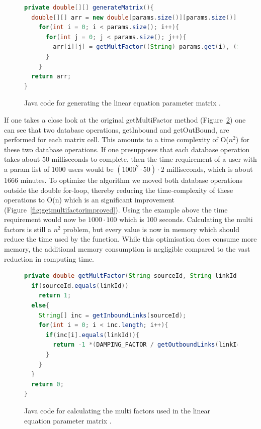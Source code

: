 \begin{figure}[h!]
\begin{lstlisting}[language=java]
private double[][] generateMatrix(){ 
  double[][] arr = new double[params.size()][params.size()]; 
    for(int i = 0; i < params.size(); i++){ 
      for(int j = 0; j < params.size(); j++){ 
        arr[i][j] = getMultFactor((String) params.get(i), (String) params.get(j));
      }
    } 
  return arr;
}
\end{lstlisting}
\caption{Java code for generating the linear equation parameter matrix \protect \cite{Goodrarzi2009}.}
\label{fig:generateMatrix}
\end{figure}

If one takes a close look at the original getMultiFactor method (Figure~\ref{fig:getmultifactor}) one can see that two database operations, getInbound and getOutBound, are performed for each matrix cell. This amounts to a time complexity of O(\( n^2\)) for these two database operations. If one presupposes that each database operation takes about 50 milliseconds to complete, then the time requirement of a user with a param list of 1000 users would be  \((1000^2 \cdot 50) \cdot 2\) milliseconds, which is about 1666 minutes. To optimize the algorithm we moved both database operations outside the double for-loop, thereby reducing the time-complexity of these operations to O(n) which is an significant improvement (Figure~\ref{fig:getmultifactorimproved}). Using the example above the time requirement would now be \(1000 \cdot 100\) which is 100 seconds. Calculating the multi factors is still a \(n^2\) problem, but every value is now in memory which should reduce the time used by the function. While this optimisation does consume more memory, the additional memory consumption is negligible compared to the vast reduction in computing time.

\begin{figure}[h!]
\begin{lstlisting}[language=java]
private double getMultFactor(String sourceId, String linkId){ 
  if(sourceId.equals(linkId)) 
    return 1;
  else{
    String[] inc = getInboundLinks(sourceId); 
    for(int i = 0; i < inc.length; i++){ 
      if(inc[i].equals(linkId)){ 
        return -1 *(DAMPING_FACTOR / getOutboundLinks(linkId).length);
      } 
    }
  } 
  return 0;
}
\end{lstlisting}
\caption{Java code for calculating the multi factors used in the linear equation parameter matrix \protect \cite{Goodrarzi2009}.}
\label{fig:getmultifactor}
\end{figure}

